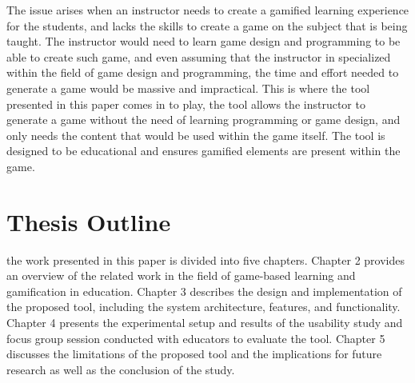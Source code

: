 The issue arises when an instructor needs to create a gamified learning experience for the students, and lacks the skills to create a game on the subject that is being taught. The instructor would need to learn game design and programming to be able to create such game, and even assuming that the instructor in specialized within the field of game design and programming, the time and effort needed to generate a game would be massive and impractical. This is where the tool presented in this paper comes in to play, the tool allows the instructor to generate a game without the need of learning programming or game design, and only needs the content that would be used within the game itself. The tool is designed to be educational and ensures gamified elements are present within the game. 

\section{Thesis Outline}
the work presented in this paper is divided into five chapters. Chapter 2 provides an overview of the related work in the field of game-based learning and gamification in education. Chapter 3 describes the design and implementation of the proposed tool, including the system architecture, features, and functionality. Chapter 4 presents the experimental setup and results of the usability study and focus group session conducted with educators to evaluate the tool. Chapter 5 discusses the limitations of the proposed tool and the implications for future research as well as the conclusion of the study.